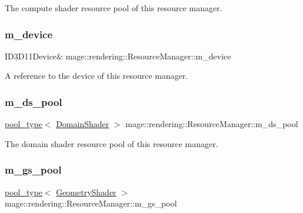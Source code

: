 The compute shader resource pool of this resource manager. \hypertarget{classmage_1_1rendering_1_1_resource_manager_ad5233c9a748dcd828e5176ad5e8282c9}{}\label{classmage_1_1rendering_1_1_resource_manager_ad5233c9a748dcd828e5176ad5e8282c9} 
\subsubsection{\texorpdfstring{m\+\_\+device}{m\_device}}
{\footnotesize\ttfamily I\+D3\+D11\+Device\& mage\+::rendering\+::\+Resource\+Manager\+::m\+\_\+device\hspace{0.3cm}{\ttfamily [private]}}

A reference to the device of this resource manager. \hypertarget{classmage_1_1rendering_1_1_resource_manager_a49ccc18bfbca9728857d820266c3acf6}{}\label{classmage_1_1rendering_1_1_resource_manager_a49ccc18bfbca9728857d820266c3acf6} 
\subsubsection{\texorpdfstring{m\+\_\+ds\+\_\+pool}{m\_ds\_pool}}
{\footnotesize\ttfamily \hyperlink{classmage_1_1rendering_1_1_resource_manager_ab21a4e280087032ee533f267bd9bf602}{pool\+\_\+type}$<$ \hyperlink{namespacemage_1_1rendering_a02bd57ea68f48dd6e0d37a1362ad1ea2}{Domain\+Shader} $>$ mage\+::rendering\+::\+Resource\+Manager\+::m\+\_\+ds\+\_\+pool\hspace{0.3cm}{\ttfamily [private]}}

The domain shader resource pool of this resource manager. \hypertarget{classmage_1_1rendering_1_1_resource_manager_aa8fe17aa004cb46afc132a672bbb014d}{}\label{classmage_1_1rendering_1_1_resource_manager_aa8fe17aa004cb46afc132a672bbb014d} 
\subsubsection{\texorpdfstring{m\+\_\+gs\+\_\+pool}{m\_gs\_pool}}
{\footnotesize\ttfamily \hyperlink{classmage_1_1rendering_1_1_resource_manager_ab21a4e280087032ee533f267bd9bf602}{pool\+\_\+type}$<$ \hyperlink{namespacemage_1_1rendering_accaa3591de8a0d7a2c72c1dcc0cf9592}{Geometry\+Shader} $>$ mage\+::rendering\+::\+Resource\+Manager\+::m\+\_\+gs\+\_\+pool\hspace{0.3cm}{\ttfamily [private]}}

